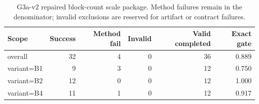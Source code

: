 \begin{table}[t]
\centering
\small
\begin{tabular}{lrrrrr}
\toprule
Scope & Success & Method fail & Invalid & Valid completed & Exact gate \\
\midrule
overall & 32 & 4 & 0 & 36 & 0.889 \\
variant=B1 & 9 & 3 & 0 & 12 & 0.750 \\
variant=B2 & 12 & 0 & 0 & 12 & 1.000 \\
variant=B4 & 11 & 1 & 0 & 12 & 0.917 \\
\bottomrule
\end{tabular}
\caption{G3a-v2 repaired block-count scale package. Method failures remain in the denominator; invalid exclusions are reserved for artifact or contract failures.}
\end{table}
